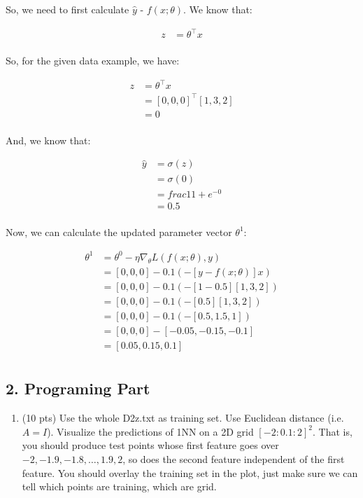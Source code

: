 \documentclass[11pt]{article}
\providecommand{\tightlist}{%
      \setlength{\itemsep}{0pt}\setlength{\parskip}{0pt}}
\begin{document}
So, we need to first calculate \(\hat{y}\) - \(f(x;\theta)\). We know
that:

\[
\begin{align}
z &= \theta^\top x \\
\end{align}
\]

So, for the given data example, we have:

\[
\begin{align}
z &= \theta^\top x \\
&= [0, 0, 0]^\top [1, 3, 2] \\
&= 0 \\
\end{align}
\]

And, we know that:

\[
\begin{align}
\hat{y} &= \sigma(z) \\
&= \sigma(0) \\
&= frac{1}{1 + e^{-0}} \\
&= 0.5 \\
\end{align}
\]

Now, we can calculate the updated parameter vector \(\theta^{1}\):

\[
\begin{align}
\theta^{1} &= \theta^{0} - \eta \nabla_{\theta} L(f(x;\theta), y) \\
&= [0, 0, 0] - 0.1 (-[y - f(x;\theta)] x) \\
&= [0, 0, 0] - 0.1 (-[1 - 0.5] [1, 3, 2]) \\
&= [0, 0, 0] - 0.1 (-[0.5] [1, 3, 2]) \\
&= [0, 0, 0] - 0.1 (-[0.5, 1.5, 1]) \\
&= [0, 0, 0] - [-0.05, -0.15, -0.1] \\
&= [0.05, 0.15, 0.1] \\
\end{align}
\]

    \hypertarget{programing-part}{%
\subsection{2. Programing Part}\label{programing-part}}

    \begin{enumerate}
\def\labelenumi{\arabic{enumi}.}
\tightlist
\item
  (10 pts) Use the whole D2z.txt as training set. Use Euclidean distance
  (i.e. \(A=I\)). Visualize the predictions of 1NN on a 2D grid
  \([-2:0.1:2]^2\). That is, you should produce test points whose first
  feature goes over \(-2, -1.9, -1.8, \ldots, 1.9, 2\), so does the
  second feature independent of the first feature. You should overlay
  the training set in the plot, just make sure we can tell which points
  are training, which are grid.
\end{enumerate}
\end{document}

